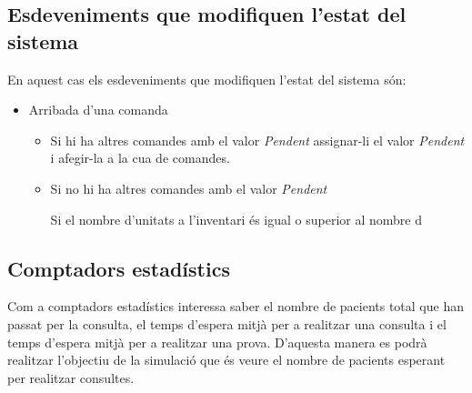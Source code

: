 \documentclass[a4paper]{article}
\begin{document}
\subsection{Esdeveniments que modifiquen l'estat del sistema}
En aquest cas els esdeveniments que modifiquen l'estat del sistema són:
\begin{itemize}
	\item Arribada d'una comanda
	\begin{itemize}
		\item Si hi ha altres comandes amb el valor \emph{Pendent} assignar-li el valor \emph{Pendent} i afegir-la a la cua de comandes.
		\item Si no hi ha altres comandes amb el valor \emph{Pendent}
		\begin{itemize}
			Si el nombre d'unitats a l'inventari és igual o superior al nombre d
		\end{itemize}
	\end{itemize}
\end{itemize}

\subsection{Comptadors estadístics}
Com a comptadors estadístics interessa saber el nombre de pacients total que han passat per la consulta, el temps d'espera mitjà per a realitzar una consulta i el temps d'espera mitjà per a realitzar una prova. D'aquesta manera es podrà realitzar l'objectiu de la simulació que és veure el nombre de pacients esperant per realitzar consultes.
\end{document}
